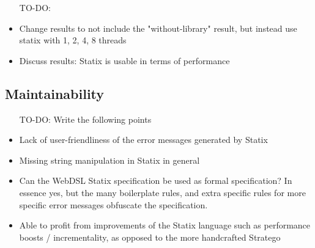     \begin{itemize}
      \item[TO-DO:]
      \item Change results to not include the "without-library" result, but instead use statix with 1, 2, 4, 8 threads
      \item Discuss results: Statix is usable in terms of performance
    \end{itemize}

  \subsection{Maintainability}

    \begin{itemize}
      \item[TO-DO: Write the following points]
      \item Lack of user-friendliness of the error messages generated by Statix
      \item Missing string manipulation in Statix in general
      \item Can the WebDSL Statix specification be used as formal specification? In essence yes, but the many boilerplate rules, and extra specific rules for more specific error messages obfuscate the specification.
      \item Able to profit from improvements of the Statix language such as performance boosts / incrementality, as opposed to the more handcrafted Stratego 
    \end{itemize}
